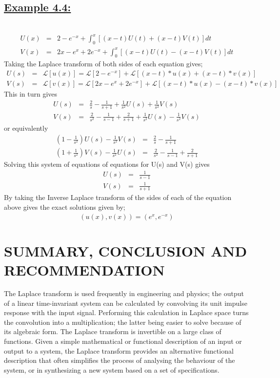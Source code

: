 \documentclass[11pt]{report}
\newcommand{\ubt}[1]{\textbf{\underline{#1}}}
\newcommand{\sps}{\\[0.2cm]}
\newcommand{\spn}[1]{\\[#1cm]}
\newcommand{\example}[1]{\section*{\ubt{Example #1:}}{~}\spn{-1.7}}
\begin{document}
	\example{4.4}
	\begin{eqnarray*}
		U(x) &=& 2 - e^{-x} +\int_{0}^{x} [(x - t)U(t) + (x - t)V(t)]dt\sps
		V(x) &=& 2x - e^x + 2e^{-x} + \int_{0}^{x} [(x - t)U(t) - (x - t)V(t)]dt
	\end{eqnarray*}
	Taking the Laplace transform of both sides of each equation gives;
	\begin{eqnarray*}
		U(s) &=& \mathcal{L}[u(x)] = \mathcal{L}[2 - e^{-x}] + \mathcal{L}[(x - t) * u(x) + (x - t) * v(x)]\sps
		V(s) &=& \mathcal{L}[v(x)] = \mathcal{L}[2x - e^x + 2e^{-x}] + \mathcal{L}[(x - t) * u(x) - (x - t) * v(x)]
	\end{eqnarray*}
	This in turn gives
	\begin{eqnarray*}
		U(s) &=& \frac{2}{s} - \frac{1}{s + 1} + \frac{1}{s^2}U(s) + \frac{1}{s^2}V(s)\sps
		V(s) &=& \frac{2}{s^2} - \frac{1}{s - 1} + \frac{2}{s + 1} + \frac{1}{s^2}U(s) - \frac{1}{s^2}V(s)
	\end{eqnarray*}
	or equivalently
	\begin{eqnarray*}
		(1 - \frac{1}{s^2})U(s) - \frac{1}{s^2}V(s) &=& \frac{2}{s} - \frac{1}{s + 1}\sps
		(1 +\frac{1}{s^2})V(s) - \frac{1}{s^2}U(s) &=& \frac{2}{s^2} - \frac{1}{s - 1} + \frac{2}{s + 1}
	\end{eqnarray*}
	Solving this system of equations of equations for U(s) and V(s) gives
	\begin{eqnarray*}
		U(s) &=& \frac{1}{s - 1}\sps
		V(s) &=& \frac{1}{s + 1}
	\end{eqnarray*}	
	By taking the Inverse Laplace transform of the sides of each of the equation above gives the exact solutions given by;
	\begin{eqnarray*}
		(u(x), v(x)) =(e^x, e^{-x})
	\end{eqnarray*}



	\chapter{SUMMARY, CONCLUSION AND RECOMMENDATION}
	The Laplace transform is used frequently in engineering and physics; the output of a linear time-invariant system can be calculated by convolving its unit impulse response with the input signal. Performing this calculation in Laplace space turns the convolution into a multiplication; the latter being easier to solve because of its algebraic form. The Laplace transform is invertible on a large class of functions. Given a simple mathematical or functional description of an input or output to a system, the Laplace transform provides an alternative functional description that often simplifies the process of analysing the behaviour of the system, or in synthesizing a new system based on a set of specifications.\\
	
\end{document}
